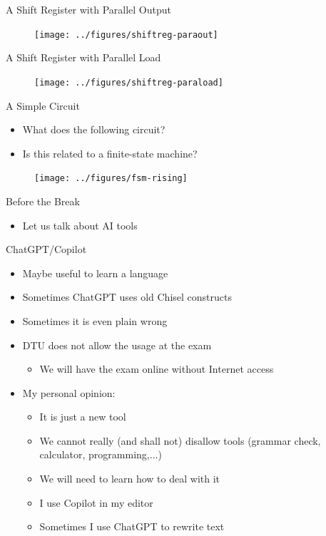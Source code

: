 \begin{frame}[fragile]{A Shift Register with Parallel Output}
\begin{figure}
  \texttt{[image: ../figures/shiftreg-paraout]}
\end{figure}
\end{frame}

\begin{frame}[fragile]{A Shift Register with Parallel Load}
\begin{figure}
  \texttt{[image: ../figures/shiftreg-paraload]}
\end{figure}
\end{frame}



\begin{frame}[fragile]{A Simple Circuit}
\begin{itemize}
\item What does the following circuit?
\item Is this related to a finite-state machine?
\end{itemize}
\begin{figure}
  \texttt{[image: ../figures/fsm-rising]}
\end{figure}
\end{frame}

\begin{frame}[fragile]{Before the Break}
\begin{itemize}
\item Let us talk about AI tools
\end{itemize}
\end{frame}

\begin{frame}[fragile]{ChatGPT/Copilot}
\begin{itemize}
\item Maybe useful to learn a language
\item Sometimes ChatGPT uses old Chisel constructs
\item Sometimes it is even plain wrong
\item DTU does not allow the usage at the exam
\begin{itemize}
\item We will have the exam online without Internet access
\end{itemize}
\item My personal opinion:
\begin{itemize}
\item It is just a new tool
\item We cannot really (and shall not) disallow tools (grammar check, calculator, programming,...)
\item We will need to learn how to deal with it
\item I use Copilot in my editor
\item Sometimes I use ChatGPT to rewrite text
\end{itemize}
\end{itemize}
\end{frame}

